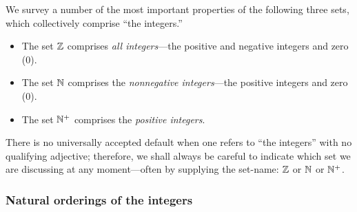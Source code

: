 We survey a number of the most important properties of the following three sets, which collectively comprise ``the integers.''
\begin{itemize}
\item
The set $\mathbb{Z}$ comprises {\em all integers}---the positive and negative integers and zero ($0$).
\item
The set $\mathbb{N}$ comprises the {\em nonnegative integers}---the positive integers and zero ($0$).
\item
The set $\mathbb{N}^+$ comprises the {\em positive integers}.
\end{itemize}
There is no universally accepted default when one refers to ``the integers'' with no qualifying adjective; therefore, we shall always be careful to indicate which set we are discussing at any moment---often by supplying the set-name: $\mathbb{Z}$ or $\mathbb{N}$ or $\mathbb{N}^+$.

\subsubsection{Natural orderings of the integers}
\label{sec:natural-orderings}

